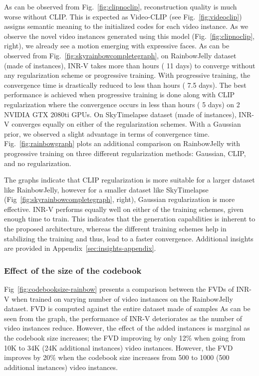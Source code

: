 \documentclass[10pt]{article} \usepackage[accepted]{tmlr}
\begin{document}
As can be observed from Fig.~\ref{fig:clipnoclip}, reconstruction quality is much worse without CLIP. This is expected as Video-CLIP (see Fig.~\ref{fig:videoclip}) assigns semantic meaning to the initialized codes for each video instance. As we observe the 
novel video instances generated using this model (Fig.~\ref{fig:clipnoclip}, right), we already see a motion emerging with expressive faces. 
As can be observed from Fig.~\ref{fig:skyrainbowcompletegraph}, on RainbowJelly dataset (made of  instances), INR-V takes more than  hours ( 11 days) to converge without any regularization scheme or progressive training. With progressive training, the convergence time is drastically reduced to less than  hours ( 7.5 days). The best performance is achieved when progressive training is done along with CLIP regularization where the convergence occurs in less than  hours ( 5 days) on 2 NVIDIA GTX 2080ti GPUs. On SkyTimelapse dataset (made of  instances), INR-V converges equally on either of the regularization schemes. With a Gaussian prior, we observed a slight advantage in terms of convergence time. Fig.~\ref{fig:rainbowgraph} plots an additional comparison on RainbowJelly with progressive training on three different regularization methods: Gaussian, CLIP, and no regularization.

The graphs indicate that CLIP regularization is more suitable for a larger dataset like RainbowJelly, however for a smaller dataset like SkyTimelapse (Fig~\ref{fig:skyrainbowcompletegraph}, right), Gaussian regularization is more effective. 
INR-V performs equally well on either of the training schemes, given enough time to train. This indicates that the generation capabilities is inherent to the proposed architecture, whereas the different training schemes help in stabilizing the training and thus, lead to a faster convergence. Additional insights are provided in Appendix~\ref{sec:insights-appendix}.

\subsubsection{Effect of the size of the codebook}

Fig~\ref{fig:codebooksize-rainbow} presents a comparison between the FVDs of INR-V when trained on varying number of video instances on the RainbowJelly dataset. FVD is computed against the entire dataset made of  samples
As can be seen from the graph, the performance of INR-V deteriorates as the number of video instances reduce. However, the effect of the added instances is marginal as the codebook size increases; the FVD improving by only 12\% when going from 10K to 34K (24K additional instances) video instances. However, the FVD improves by 20\% when the codebook size increases from 500 to 1000 (500 additional instances) video instances.
\end{document}

